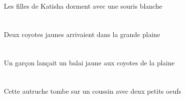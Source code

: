 \begin{exe}
   \DEFPlAbsP{}    \INDSgOblP{}   \KatishaASgOblP{}   \DEP{}   \filleCPlAbsP{}    \INDSgOblP{}   \blancBSgP{}   \sourisBSgOblP{}   \AVECP{}  \dormirViPrsCPlP{} \\
   \DEFPlAbsG{}    \INDSgOblG{}   \KatishaASgOblG{}   \DEG{}   \filleCPlAbsG{}    \INDSgOblG{}   \blancBSgG{}   \sourisBSgOblG{}   \AVECG{}  \dormirViPrsCPlG{} \\
 Les filles de Katisha dorment avec une souris blanche
\ex\glll
   \INDDuAbs{}   \jauneCDu{}   \coyoteCDuAbs{}    \DEFSgObl{}   \grandASg{}   \plaineASgObl{}   \DANS{}  \arriverViPstCDu{} \\
   \INDDuAbsP{}   \jauneCDuP{}   \coyoteCDuAbsP{}    \DEFSgOblP{}   \grandASgP{}   \plaineASgOblP{}   \DANSP{}  \arriverViPstCDuP{} \\
   \INDDuAbsG{}   \jauneCDuG{}   \coyoteCDuAbsG{}    \DEFSgOblG{}   \grandASgG{}   \plaineASgOblG{}   \DANSG{}  \arriverViPstCDuG{} \\
 Deux coyotes jaunes arrivaient dans la grande plaine
\ex\glll
   \INDSgErg{}   \garconDSgErg{}    \DEFPlObl{}    \DEFSgObl{}   \plaineASgObl{}   \DE{}   \coyoteCPlObl{}   \A{}   \INDSgAbs{}   \jauneASg{}   \balaiASgAbs{}  \lancerVdPstASg{} \\
   \INDSgErgP{}   \garconDSgErgP{}    \DEFPlOblP{}    \DEFSgOblP{}   \plaineASgOblP{}   \DEP{}   \coyoteCPlOblP{}   \AP{}   \INDSgAbsP{}   \jauneASgP{}   \balaiASgAbsP{}  \lancerVdPstASgP{} \\
   \INDSgErgG{}   \garconDSgErgG{}    \DEFPlOblG{}    \DEFSgOblG{}   \plaineASgOblG{}   \DEG{}   \coyoteCPlOblG{}   \AG{}   \INDSgAbsG{}   \jauneASgG{}   \balaiASgAbsG{}  \lancerVdPstASgG{} \\
 Un garçon lançait un balai jaune aux coyotes de la plaine
\ex\glll
    \INDDuObl{}   \petitCDu{}   \oeufCDuObl{}   \AVEC{}   \DEMSgAbs{}   \autrucheBSgAbs{}    \INDSgObl{}   \coussinBSgObl{}   \SUR{}  \tomberViPrsBSg{} \\
    \INDDuOblP{}   \petitCDuP{}   \oeufCDuOblP{}   \AVECP{}   \DEMSgAbsP{}   \autrucheBSgAbsP{}    \INDSgOblP{}   \coussinBSgOblP{}   \SURP{}  \tomberViPrsBSgP{} \\
    \INDDuOblG{}   \petitCDuG{}   \oeufCDuOblG{}   \AVECG{}   \DEMSgAbsG{}   \autrucheBSgAbsG{}    \INDSgOblG{}   \coussinBSgOblG{}   \SURG{}  \tomberViPrsBSgG{} \\
 Cette autruche tombe sur un coussin avec deux petits oeufs
\ex\glll
   \DEFPlAbs{}   \petitBPl{}   \sourisBPlAbs{}    \INDSgObl{}   \noirDSg{}   \chatDSgObl{}   \SUR{}  \tomberViPrsBPl{} \\

\end{exe}
